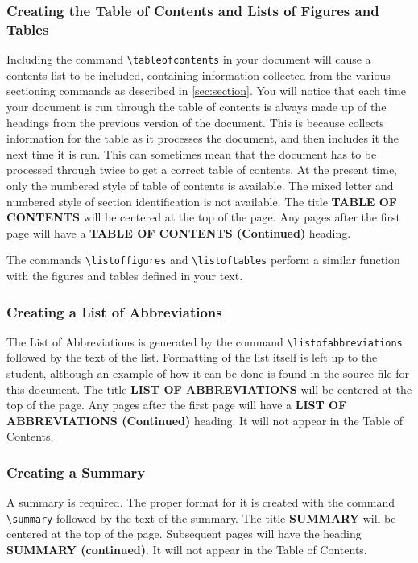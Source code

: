 \subsubsection{Creating the Table of Contents
and Lists of Figures and Tables}
\label{sec:toclflt}
Including the command \verb|\tableofcontents| in your document will cause
a contents list to be included, containing information collected from
the various sectioning commands as described in \ref{sec:section}.
You will notice that each time your document is run through \uicthesi{}
the table of contents is always made up of the headings from
the previous version of the document.
This is because \uicthesi{} collects information for the table as
it processes the document, and then includes it
the next time it is run.
This can sometimes mean that the document has to be
processed through \uicthesi{} twice to get a correct table of contents.
At the present time, only the numbered style of table of contents
is available.  The mixed letter and numbered style of section
identification is not available.
The title {\bf TABLE OF CONTENTS} will be centered at the
top of the page.
Any pages after the first page will have a
{\bf TABLE OF CONTENTS (Continued)} heading.
 
The commands \verb+\listoffigures+ and \verb+\listoftables+ perform a
similar function with the figures and tables defined in your text.
 
\subsubsection{Creating a List of Abbreviations}
The List of Abbreviations is generated by the command
\verb+\listofabbreviations+ followed by the text of the list.
Formatting of the list itself is left up to the student, although an
example of how it can be done is found in the source file for this
document.
The title {\bf LIST OF ABBREVIATIONS} will be centered at the
top of the page.
Any pages after the first page will have a
{\bf LIST OF ABBREVIATIONS (Continued)} heading.
It will not appear in the Table of Contents.
 
\subsubsection{Creating a Summary}
A summary is required.
The proper format for it is created with the command \verb+\summary+
followed by the text of the summary.
The title {\bf SUMMARY} will be centered at the top of the page.
Subsequent pages will have the heading {\bf SUMMARY (continued)}.
It will not appear in the Table of Contents.
 
